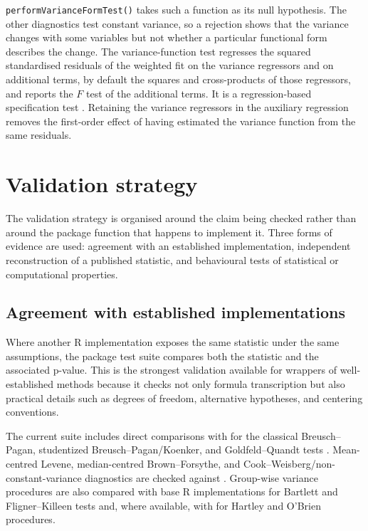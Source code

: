 \texttt{performVarianceFormTest()} takes such a function as its null hypothesis. The
other diagnostics test constant variance, so a rejection shows that the
variance changes with some variables but not whether a particular functional
form describes the change. The variance-function test regresses the squared
standardised residuals of the weighted fit on the variance regressors and on
additional terms, by default the squares and cross-products of those
regressors, and reports the \(F\) test of the additional terms. It is a
regression-based specification test
\citep{wooldridge1990unified, wooldridge1991application}. Retaining the variance
regressors in the auxiliary regression removes the first-order effect of
having estimated the variance function from the same residuals.

\section{Validation strategy}\label{validation-strategy}

The validation strategy is organised around the claim being checked rather than
around the package function that happens to implement it. Three forms of
evidence are used: agreement with an established implementation, independent
reconstruction of a published statistic, and behavioural tests of statistical
or computational properties.

\subsection{Agreement with established implementations}\label{agreement-with-established-implementations}

Where another R implementation exposes the same statistic under the same
assumptions, the package test suite compares both the statistic and the
associated p-value. This is the strongest validation available for wrappers of
well-established methods because it checks not only formula transcription but
also practical details such as degrees of freedom, alternative hypotheses, and
centering conventions.

The current suite includes direct comparisons with  for the
classical Breusch--Pagan, studentized Breusch--Pagan/Koenker, and
Goldfeld--Quandt tests \citep{goldfeld1965tests, zeileis2002lmtest}. Mean-centred Levene,
median-centred Brown--Forsythe, and Cook--Weisberg/non-constant-variance
diagnostics are checked against  \citep{fox2019car}. Group-wise
variance procedures are also compared with base R implementations for Bartlett
and Fligner--Killeen tests and, where available, with  for
Hartley and O'Brien procedures.

